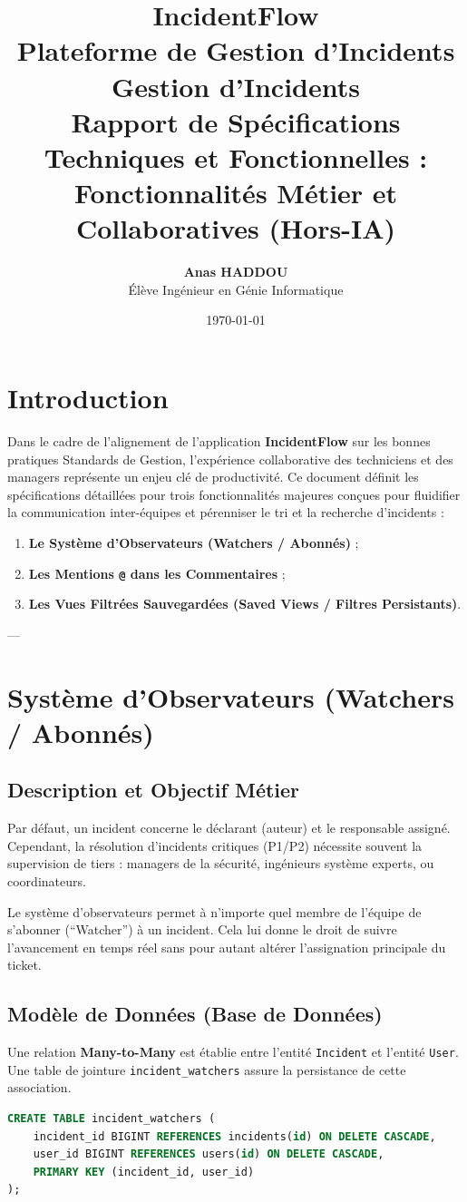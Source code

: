 \documentclass[12pt,a4paper]{article}
\title{
    \textbf{\Huge IncidentFlow}\\[0.5cm]
    \Large Plateforme de Gestion d'Incidents Gestion d'Incidents\\[1.5cm]
    \textbf{\Large Rapport de Spécifications Techniques et Fonctionnelles :\\ Fonctionnalités Métier et Collaboratives (Hors-IA)}
    \vspace{1cm}
}
\author{\textbf{Anas HADDOU} \\ Élève Ingénieur en Génie Informatique}
\date{\today}
\begin{document}
\maketitle
\thispagestyle{empty}
\clearpage

\tableofcontents
\clearpage

\section{Introduction}
Dans le cadre de l'alignement de l'application \textbf{IncidentFlow} sur les bonnes pratiques Standards de Gestion, l'expérience collaborative des techniciens et des managers représente un enjeu clé de productivité. Ce document définit les spécifications détaillées pour trois fonctionnalités majeures conçues pour fluidifier la communication inter-équipes et pérenniser le tri et la recherche d'incidents :
\begin{enumerate}
    \item \textbf{Le Système d'Observateurs (Watchers / Abonnés)} ;
    \item \textbf{Les Mentions \texttt{@} dans les Commentaires} ;
    \item \textbf{Les Vues Filtrées Sauvegardées (Saved Views / Filtres Persistants)}.
\end{enumerate}

---

\section{Système d'Observateurs (Watchers / Abonnés)}
\subsection{Description et Objectif Métier}
Par défaut, un incident concerne le déclarant (auteur) et le responsable assigné. Cependant, la résolution d'incidents critiques (P1/P2) nécessite souvent la supervision de tiers : managers de la sécurité, ingénieurs système experts, ou coordinateurs. 

Le système d'observateurs permet à n'importe quel membre de l'équipe de s'abonner (``Watcher'') à un incident. Cela lui donne le droit de suivre l'avancement en temps réel sans pour autant altérer l'assignation principale du ticket.

\subsection{Modèle de Données (Base de Données)}
Une relation \textbf{Many-to-Many} est établie entre l'entité \texttt{Incident} et l'entité \texttt{User}. Une table de jointure \texttt{incident\_watchers} assure la persistance de cette association.
\begin{lstlisting}[language=SQL, caption=Schema SQL de la table de jointure, label=sql-watchers]
CREATE TABLE incident_watchers (
    incident_id BIGINT REFERENCES incidents(id) ON DELETE CASCADE,
    user_id BIGINT REFERENCES users(id) ON DELETE CASCADE,
    PRIMARY KEY (incident_id, user_id)
);
\end{lstlisting}
\end{document}
